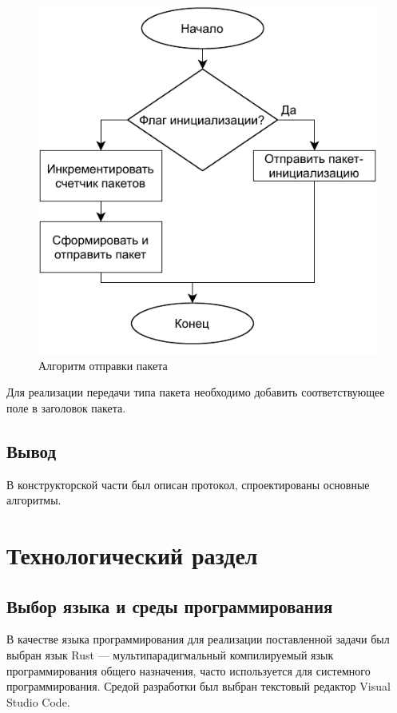 \documentclass[14pt, a4paper]{extarticle}
\begin{document}
\begin{figure}[H]
	\centering
	\includegraphics[scale=1]{send.pdf}
	\caption{Алгоритм отправки пакета}
	\label{send}
\end{figure}

\indent Для реализации передачи типа пакета необходимо добавить соответствующее поле в заголовок пакета.
\subsection{Вывод}
В конструкторской части был описан протокол, спроектированы основные алгоритмы. 

\clearpage
\section{Технологический раздел}
\subsection{Выбор языка и среды программирования}
В качестве языка программирования для реализации поставленной
задачи был выбран язык Rust --- мультипарадигмальный компилируемый язык программирования общего назначения, часто используется для системного программирования. Средой разработки был выбран текстовый редактор Visual Studio Code.
\end{document}
